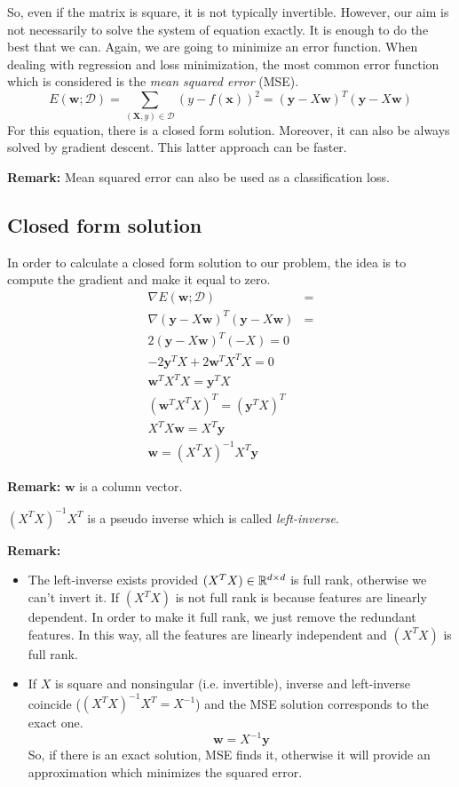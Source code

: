 So, even if the matrix is square, it is not typically invertible. However, our aim is not necessarily to solve the system of equation exactly. It is enough to do the best that we can. Again, we are going to minimize an error function. When dealing with regression and loss minimization, the most common error function which is considered is the \textit{mean squared error} (MSE).
\begin{equation}
    E(\pmb{w}; \mathcal{D}) = \sum_{(\pmb{X},y) \in \mathcal{D}} (y-f(\pmb{x}))^2 = (\pmb{y}-X\pmb{w})^T (\pmb{y} - X \pmb{w})
\end{equation}
For this equation, there is a closed form solution. Moreover, it can also be always solved by gradient descent. This latter approach can be faster. \newline

\textbf{Remark:} Mean squared error can also be used as a classification loss.

\subsection{Closed form solution}
In order to calculate a closed form solution to our problem, the idea is to compute the gradient and make it equal to zero.
\begin{align*}
    \nabla E(\pmb{w}; \mathcal{D}) &=\\
    \nabla (\pmb{y}-X \pmb{w})^T (\pmb{y} - X \pmb{w}) &=\\
    2(\pmb{y}-X \pmb{w})^T (-X) = 0 \\
    -2 \pmb{y}^T X + 2\pmb{w}^T X^T X = 0 \\
    \pmb{w}^T X^T X = \pmb{y}^T X \\
    (\pmb{w}^T X^T X)^T = (\pmb{y}^T X)^T \\
    X^T X \pmb{w} = X^T \pmb{y} \\
    \pmb{w} = (X^T X)^{-1} X^{T} \pmb{y}
\end{align*}

\textbf{Remark:} $\pmb{w}$ is a column vector. \newline

$(X^T X)^{-1} X^{T}$ is a pseudo inverse which is called \textit{left-inverse}. \newline

\textbf{Remark:}
\begin{itemize}
    \item The left-inverse exists provided $(X^T X)\in \mathbb{R}^{d \times d}$ is full rank, otherwise we can't invert it. If $(X^T X)$ is not full rank is because features are linearly dependent. In order to make it full rank, we just remove the redundant features. In this way, all the features are linearly independent and $(X^T X)$ is full rank.
    
    \item If $X$ is square and nonsingular (i.e. invertible), inverse and left-inverse coincide ($(X^T X)^{-1} X^{T} = X^{-1}$) and the MSE solution corresponds to the exact one.
    $$\pmb{w} = X^{-1} \pmb{y}$$
    So, if there is an exact solution, MSE finds it, otherwise it will provide an approximation which minimizes the squared error.
\end{itemize}

